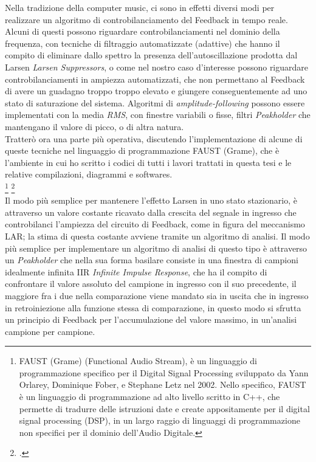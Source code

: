 Nella tradizione della computer music, ci sono in effetti
diversi modi per realizzare un algoritmo di controbilanciamento 
del Feedback in tempo reale.
Alcuni di questi possono riguardare controbilanciamenti nel dominio della frequenza,
con tecniche di filtraggio automatizzate (adattive) che
hanno il compito di eliminare dallo spettro la presenza dell'autoscillazione prodotta dal Larsen \textit{Larsen Suppressors},
o come nel nostro caso d’interesse possono riguardare controbilanciamenti in ampiezza
automatizzati, che non permettano al Feedback di avere un guadagno troppo troppo elevato 
e giungere conseguentemente ad uno stato di saturazione del sistema.
Algoritmi di \textit{amplitude-following} possono essere implementati 
con la media \textit{RMS}, con finestre variabili o fisse, 
filtri \textit{Peakholder} che mantengano il valore di picco, o di altra natura. \\
Tratterò ora  una parte più operativa, discutendo l'implementazione
di alcune di queste tecniche nel linguaggio di programmazione FAUST (Grame), 
che è l'ambiente in cui ho scritto i codici di tutti i lavori trattati
in questa tesi e le relative compilazioni, diagrammi e softwares. \\
\footnote{FAUST (Grame) (Functional Audio Stream), 
è un linguaggio di programmazione specifico per il Digital Signal
Processing sviluppato da Yann Orlarey, Dominique Fober, e Stephane Letz nel
2002. Nello specifico, FAUST è un linguaggio di programmazione ad alto livello
scritto in C++, che permette di tradurre delle istruzioni date e create 
appositamente per il digital signal processing (DSP), in un largo raggio di linguaggi
di programmazione non specifici per il dominio dell’Audio Digitale.} \footcite{https://faust.grame.fr/} \\
Il modo più semplice per mantenere l’effetto Larsen in uno stato stazionario, è attraverso un
valore costante ricavato dalla crescita del segnale in ingresso 
che controbilanci l’ampiezza del circuito di Feedback, come in figura del meccanismo LAR;
la stima di questa costante avviene tramite un algoritmo di analisi.
Il modo più semplice per implementare un algoritmo di analisi di questo tipo
è attraverso un \textit{Peakholder} che nella sua forma basilare consiste in una finestra 
di campioni idealmente infinita IIR \textit{Infinite Impulse Response},
che ha il compito di confrontare il valore assoluto del campione in ingresso con il suo precedente,
il maggiore fra i due nella comparazione viene mandato sia in uscita che in ingresso 
in retroiniezione alla funzione stessa di comparazione, 
in questo modo si sfrutta un principio di Feedback per l'accumulazione
del valore massimo, in un'analisi campione per campione.


